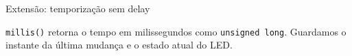 \begin{frame}[fragile,t]{Extensão: temporização sem delay}

\small \texttt{millis()} retorna o tempo em milissegundos como \texttt{unsigned long}. Guardamos o instante da última mudança e o estado atual do LED.
\end{frame}

